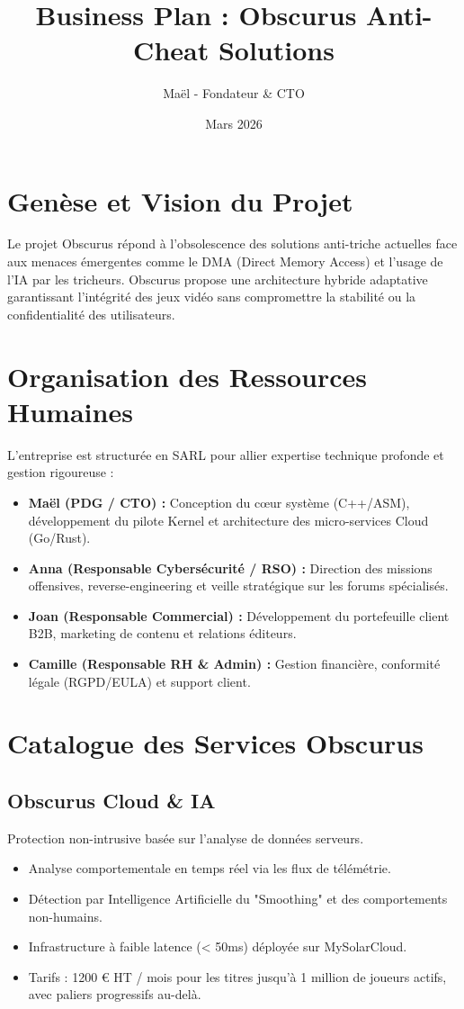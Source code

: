 \documentclass[12pt,a4paper]{article}
\title{\textbf{Business Plan : Obscurus Anti-Cheat Solutions}}
\author{Maël - Fondateur \& CTO}
\date{Mars 2026}
\begin{document}
\maketitle

\tableofcontents
\newpage

\section{Genèse et Vision du Projet}
Le projet Obscurus répond à l'obsolescence des solutions anti-triche actuelles face aux menaces émergentes comme le DMA (Direct Memory Access) et l'usage de l'IA par les tricheurs. Obscurus propose une architecture hybride adaptative garantissant l'intégrité des jeux vidéo sans compromettre la stabilité ou la confidentialité des utilisateurs.

\section{Organisation des Ressources Humaines}
L'entreprise est structurée en SARL pour allier expertise technique profonde et gestion rigoureuse :
\begin{itemize}
    \item \textbf{Maël (PDG / CTO) :} Conception du cœur système (C++/ASM), développement du pilote Kernel et architecture des micro-services Cloud (Go/Rust).
    \item \textbf{Anna (Responsable Cybersécurité / RSO) :} Direction des missions offensives, reverse-engineering et veille stratégique sur les forums spécialisés.
    \item \textbf{Joan (Responsable Commercial) :} Développement du portefeuille client B2B, marketing de contenu et relations éditeurs.
    \item \textbf{Camille (Responsable RH \& Admin) :} Gestion financière, conformité légale (RGPD/EULA) et support client.
\end{itemize}

\section{Catalogue des Services Obscurus}

\subsection{Obscurus Cloud \& IA}
Protection non-intrusive basée sur l'analyse de données serveurs.
\begin{itemize}
    \item Analyse comportementale en temps réel via les flux de télémétrie.
    \item Détection par Intelligence Artificielle du "Smoothing" et des comportements non-humains.
    \item Infrastructure à faible latence (< 50ms) déployée sur MySolarCloud.
    \item Tarifs : 1200 € HT / mois pour les titres jusqu'à 1 million de joueurs actifs, avec paliers progressifs au-delà.
\end{itemize}
\end{document}
